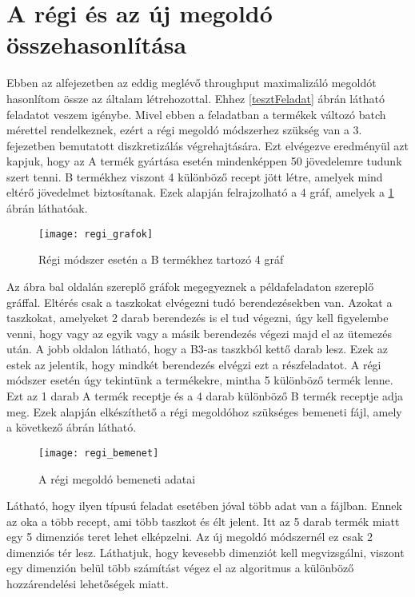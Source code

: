 \section{A régi és az új megoldó összehasonlítása}
Ebben az alfejezetben az eddig meglévő throughput maximalizáló megoldót hasonlítom össze az általam létrehozottal. Ehhez \ref{tesztFeladat} ábrán látható feladatot veszem igénybe. Mivel ebben a feladatban a termékek változó batch mérettel rendelkeznek, ezért a régi megoldó módszerhez szükség van a 3. fejezetben bemutatott diszkretizálás végrehajtására. Ezt elvégezve eredményül azt kapjuk, hogy az A termék gyártása esetén mindenképpen 50 jövedelemre tudunk szert tenni. B termékhez viszont 4 különböző recept jött létre, amelyek mind eltérő jövedelmet biztosítanak. Ezek alapján felrajzolható a 4 gráf, amelyek a \ref{regi_grafok} ábrán láthatóak.
\begin{figure}[H]
\begin{center}
\texttt{[image: regi\_grafok]}
\caption{Régi módszer esetén a B termékhez tartozó 4 gráf}
\label{regi_grafok}
\end{center}
\end{figure}
Az ábra bal oldalán szereplő gráfok megegyeznek a példafeladaton szereplő gráffal. Eltérés csak a taszkokat elvégezni tudó berendezésekben van. Azokat a  taszkokat, amelyeket 2 darab berendezés is el tud végezni, úgy kell figyelembe venni, hogy vagy az egyik vagy a másik berendezés végezi majd el az ütemezés után. A jobb oldalon látható, hogy a B3-as taszkból kettő darab lesz. Ezek az estek az jelentik, hogy mindkét berendezés elvégzi ezt a részfeladatot. A régi módszer esetén úgy tekintünk a termékekre, mintha 5 különböző termék lenne. Ezt az 1 darab A termék receptje és a 4 darab különböző B termék receptje adja meg. Ezek alapján elkészíthető a régi megoldóhoz szükséges bemeneti fájl, amely a következő ábrán látható. 

\begin{figure}[H]
\begin{center}
\texttt{[image: regi\_bemenet]}
\caption{A régi megoldó bemeneti adatai}
\label{regi_bemenet}
\end{center}
\end{figure}

Látható, hogy ilyen típusú feladat esetében jóval több adat van a fájlban. Ennek az oka a több recept, ami több taszkot és élt jelent. Itt az 5 darab termék miatt egy 5 dimenziós teret lehet elképzelni. Az új megoldó módszernél ez csak 2 dimenziós tér lesz. Láthatjuk, hogy kevesebb dimenziót kell megvizsgálni, viszont egy dimenzión belül több számítást végez el az algoritmus a különböző hozzárendelési lehetőségek miatt. 

